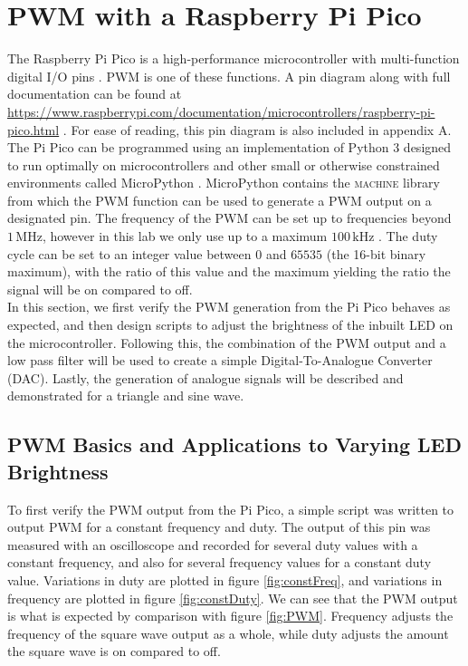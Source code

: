\documentclass[%
 reprint,
 amsmath,amssymb,
 aps,
]{revtex4-2}
\begin{document}
\section{PWM with a Raspberry Pi Pico}
The Raspberry Pi Pico is a high-performance microcontroller with multi-function digital I/O pins \cite{Pi, ucd}. PWM is one of these functions. A pin diagram along with full documentation can be found at \url{https://www.raspberrypi.com/documentation/microcontrollers/raspberry-pi-pico.html} \cite{Pi}. For ease of reading, this pin diagram is also included in appendix A.\\

The Pi Pico can be programmed using an implementation of Python 3 designed to run optimally on microcontrollers and other small or otherwise constrained environments called MicroPython \cite{micropython}. MicroPython contains the \textsc{machine} library from which the \textsc{PWM} function can be used to generate a PWM output on a designated pin. The frequency of the PWM can be set up to frequencies beyond $1\,\text{MHz}$, however in this lab we only use up to a maximum $100 \,\text{kHz}$ \cite{ucd}. The duty cycle can be set to an integer value between $0$ and $65535$ (the 16-bit binary maximum), with the ratio of this value and the maximum yielding the ratio the signal will be on compared to off.\\

In this section, we first verify the PWM generation from the Pi Pico behaves as expected, and then design scripts to adjust the brightness of the inbuilt LED on the microcontroller. Following this, the combination of the PWM output and a low pass filter will be used to create a simple Digital-To-Analogue Converter (DAC). Lastly, the generation of analogue signals will be described and demonstrated for a triangle and sine wave.
    
    \subsection{PWM Basics and Applications to Varying LED Brightness}
    To first verify the PWM output from the Pi Pico, a simple script was written to output PWM for a constant frequency and duty. The output of this pin was measured with an oscilloscope and recorded for several duty values with a constant frequency, and also for several frequency values for a constant duty value. Variations in duty are plotted in figure \ref{fig:constFreq}, and variations in frequency are plotted in figure \ref{fig:constDuty}. We can see that the PWM output is what is expected by comparison with figure \ref{fig:PWM}. Frequency adjusts the frequency of the square wave output as a whole, while duty adjusts the amount the square wave is on compared to off.\\
\end{document}
